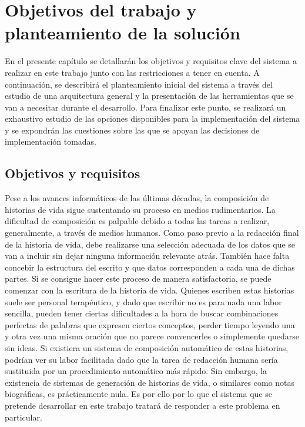 \chapter{Objetivos del trabajo y planteamiento de la solución}
\label{cap:objetivosDelTrabajoYPlanteamientoDeLaSolucion}

En el presente capítulo se detallarán los objetivos y requisitos clave del sistema a realizar en este trabajo junto con las restricciones a tener en cuenta. A continuación, se describirá el planteamiento inicial del sistema a través del estudio de una arquitectura general y la presentación de las herramientas que se van a necesitar durante el desarrollo. Para finalizar este punto, se realizará un exhaustivo estudio de las opciones disponibles para la implementación del sistema y se expondrán las cuestiones sobre las que se apoyan las decisiones de implementación tomadas.



\section{Objetivos y requisitos}
\label{sec:ObjetivosYRequisitos}
Pese a los avances informáticos de las últimas décadas, la composición de historias de vida sigue sustentando su proceso en medios rudimentarios.
La dificultad de composición es palpable debido a todas las tareas a realizar, generalmente, a través de medios humanos. Como paso previo a la redacción final de la historia de vida, debe realizarse una selección adecuada de los datos que se van a incluir sin dejar ninguna información relevante atrás. También hace falta concebir la estructura del escrito y que datos corresponden a cada una de dichas partes. Si se consigue hacer este proceso de manera satisfactoria, se puede comenzar con la escritura de la historia de vida. Quienes escriben estas historias suele ser personal terapéutico, y dado que escribir no es para nada una labor sencilla, pueden tener ciertas dificultades a la hora de buscar combinaciones perfectas de palabras que expresen ciertos conceptos, perder tiempo leyendo una y otra vez una misma oración que no parece convencerles o simplemente quedarse sin ideas. Si existiera un sistema de composición automático de estas historias, podrían ver su labor facilitada dado que la tarea de redacción humana sería sustituida por un procedimiento automático más rápido. Sin embargo, la existencia de sistemas de generación de historias de vida, o similares como notas biográficas, es prácticamente nula. Es por ello por lo que el sistema que se pretende desarrollar en este trabajo tratará de responder a este problema en particular.


